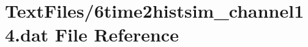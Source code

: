 \hypertarget{6time2histsim__channel14_8dat}{}\section{Text\+Files/6time2histsim\+\_\+channel14.dat File Reference}
\label{6time2histsim__channel14_8dat}
